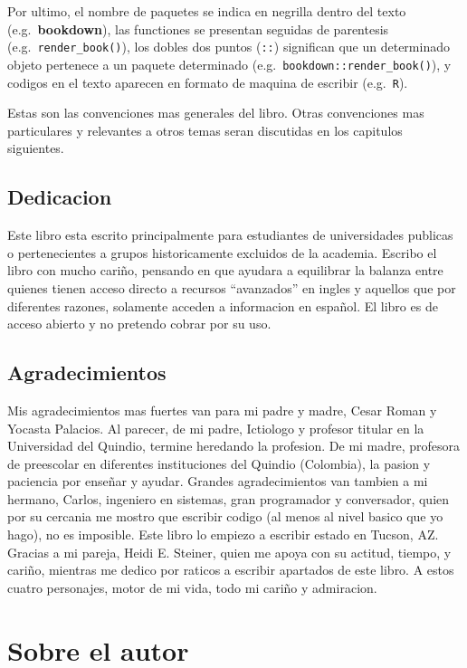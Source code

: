 \documentclass[
]{book}
\begin{document}
Por ultimo, el nombre de paquetes se indica en negrilla dentro del texto (e.g.~\textbf{bookdown}), las functiones se presentan seguidas de parentesis (e.g.~\texttt{render\_book()}), los dobles dos puntos (\texttt{::}) significan que un determinado objeto pertenece a un paquete determinado (e.g.~\texttt{bookdown::render\_book()}), y codigos en el texto aparecen en formato de maquina de escribir (e.g.~\texttt{R}).

Estas son las convenciones mas generales del libro. Otras convenciones mas particulares y relevantes a otros temas seran discutidas en los capitulos siguientes.

\hypertarget{dedicacion}{%
\section*{Dedicacion}\label{dedicacion}}


Este libro esta escrito principalmente para estudiantes de universidades publicas o pertenecientes a grupos historicamente excluidos de la academia. Escribo el libro con mucho cariño, pensando en que ayudara a equilibrar la balanza entre quienes tienen acceso directo a recursos ``avanzados'' en ingles y aquellos que por diferentes razones, solamente acceden a informacion en español. El libro es de acceso abierto y no pretendo cobrar por su uso.

\hypertarget{agradecimientos}{%
\section*{Agradecimientos}\label{agradecimientos}}


Mis agradecimientos mas fuertes van para mi padre y madre, Cesar Roman y Yocasta Palacios. Al parecer, de mi padre, Ictiologo y profesor titular en la Universidad del Quindio, termine heredando la profesion. De mi madre, profesora de preescolar en diferentes instituciones del Quindio (Colombia), la pasion y paciencia por enseñar y ayudar. Grandes agradecimientos van tambien a mi hermano, Carlos, ingeniero en sistemas, gran programador y conversador, quien por su cercania me mostro que escribir codigo (al menos al nivel basico que yo hago), no es imposible. Este libro lo empiezo a escribir estado en Tucson, AZ. Gracias a mi pareja, Heidi E. Steiner, quien me apoya con su actitud, tiempo, y cariño, mientras me dedico por raticos a escribir apartados de este libro. A estos cuatro personajes, motor de mi vida, todo mi cariño y admiracion.

\hypertarget{sobre-el-autor}{%
\chapter*{Sobre el autor}\label{sobre-el-autor}}
\end{document}
